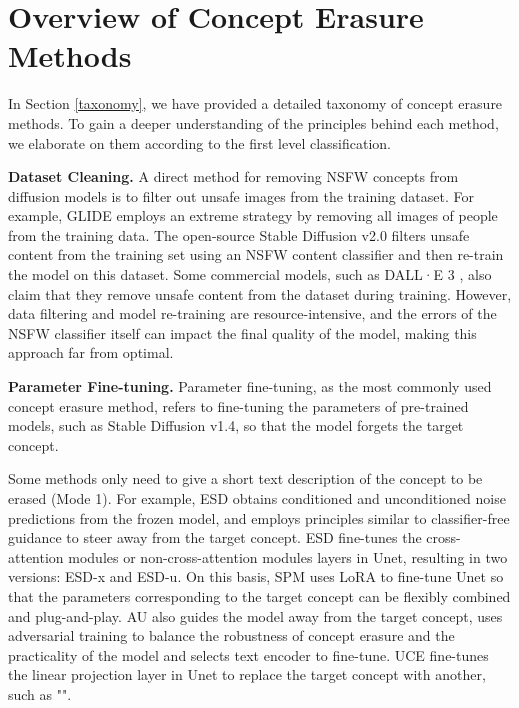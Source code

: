 \appendix

\section{Overview of Concept Erasure Methods}
\label{sec:overview-cem}
In Section \ref{taxonomy}, we have provided a detailed taxonomy of concept erasure methods. To gain a deeper understanding of the principles behind each method, we elaborate on them according to the first level classification.

\noindent\textbf{Dataset  Cleaning.}
\label{Dataset}
 A direct method for removing NSFW concepts from diffusion models is to filter out unsafe images from the training dataset. For example, GLIDE \cite{alexander2022glide} employs an extreme strategy by removing all images of people from the training data. 
 The open-source Stable Diffusion v2.0 \cite{Stable-Diffusion-2.0} filters unsafe content from the training set using an NSFW content classifier and then re-train the model on this dataset.
 Some commercial models, such as DALL·E 3 \cite{zhan2020improving}, also claim that they remove unsafe content from the dataset during training. However, data filtering and model re-training are resource-intensive, and the errors of the NSFW classifier itself can impact the final quality of the model, making this approach far from optimal.  

\noindent\textbf{Parameter Fine-tuning.}
\label{Finetuning}
Parameter fine-tuning, as the most commonly used concept erasure method, refers to fine-tuning the parameters of pre-trained models, such as Stable Diffusion v1.4, so that the model forgets the target concept.

Some methods only need to give a short text description of the concept to be erased (Mode 1). For example, ESD \cite{gandikota2023erasing-esd} obtains conditioned and unconditioned noise predictions from the frozen model, and employs principles similar to classifier-free guidance to steer away from the target concept. ESD fine-tunes the cross-attention modules or non-cross-attention modules layers in Unet, resulting in two versions: ESD-x and ESD-u. On this basis, SPM \cite{lyu2024one-spm} uses LoRA \cite{hu2021lora} to fine-tune Unet so that the parameters corresponding to the target concept can be flexibly combined and plug-and-play. AU \cite{zhang2024defensive-au} also guides the model away from the target concept, uses adversarial training to balance the robustness of concept erasure and the practicality of the model and selects text encoder to fine-tune. UCE \cite{gandikota2024unified-uce} fine-tunes the linear projection layer in Unet to replace the target concept with another, such as "".

